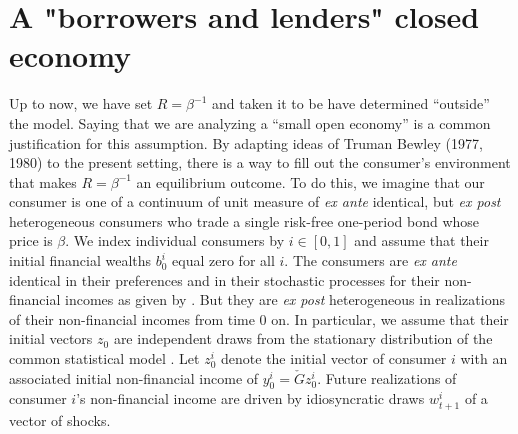 \section{A "borrowers and lenders" closed economy}\label{sec:borrowlender}%
Up to now, we have set $R = \beta^{-1}$  and  taken it to be have  
determined ``outside'' the model.  Saying that we are analyzing a ``small open economy''  is a common justification  for this assumption.
%
By adapting ideas of   Truman Bewley (1977, 1980) to the present  setting, there is a way to fill out 
the  consumer's environment  that makes  $R = \beta^{-1}$ an equilibrium outcome.  
To do this, we imagine that our consumer is one of a  continuum of unit measure of {\it ex ante} identical, but {\it ex post} 
heterogeneous consumers who trade a single risk-free one-period 
bond whose price is $\beta$.  
We index individual consumers  by $i\in [0,1]$ and 
assume that their initial financial wealths $b^i_0$  equal 
zero  for all $i$. 
The consumers are {\it ex ante} identical in their preferences and in their stochastic processes for 
their non-financial incomes as given by .
But they are {\it ex post} heterogeneous in  realizations of their non-financial incomes from time $0$ on. 
In particular, we assume that their initial
vectors $z_0$ are independent draws from the stationary distribution  of the common statistical model . Let  $z^i_0$ denote the initial vector of consumer $i$ with
an associated initial non-financial income of 
$y^i_0 = \check G  z^i_0$. 
Future realizations of consumer $i$'s non-financial income are driven by
 idiosyncratic draws $w^i_{t+1}$ of a vector of shocks.
 
